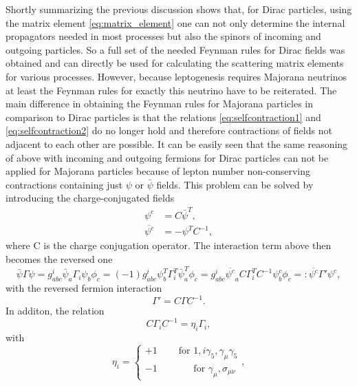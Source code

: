 Shortly summarizing the previous discussion shows that, for Dirac particles, using the matrix element \eqref{eq:matrix_element} one can not only determine the internal propagators needed in most processes but also the spinors of incoming and outgoing particles. So a full set of the needed Feynman rules for Dirac fields was obtained and can directly be used for calculating the scattering matrix elements for various processes. \newline\indent
However, because leptogenesis requires Majorana neutrinos at least the Feynman rules for exactly this neutrino have to be reiterated. The main difference in obtaining the Feynman rules for Majorana particles in comparison to Dirac particles is that the relations \eqref{eq:selfcontraction1} and \eqref{eq:selfcontraction2} do no longer hold and therefore contractions of fields not adjacent to each other are possible. It can be easily seen that the same reasoning of above with incoming and outgoing fermions for Dirac particles can not be applied for Majorana particles because of lepton number non-conserving contractions containing just $\psi$ or $\bar{\psi}$ fields.\newline\indent
This problem can be solved by introducing the charge-conjugated fields 
\begin{align*}
	\psi^c&=C\bar{\psi}^T,\\
	\overline{\psi^c}&=-\psi^T C^{-1},
\end{align*}
where C is the charge conjugation operator. The interaction term above then becomes the reversed one
\begin{equation*}
		\bar{\psi}\Gamma\psi=g^i_{abc}\bar{\psi}_a\Gamma_i\psi_b\phi_c=(-1)g^i_{abc}\psi_b^T\Gamma_i^T\bar{\psi}_a^T\phi_c=g^i_{abc}\overline{\psi^c}_aC\Gamma_i^TC^{-1}\psi^c_b\phi_c=:\overline{\psi^c}\Gamma'\psi^c,
\end{equation*}
with the reversed fermion interaction
\begin{equation*}
	\Gamma'=C\Gamma C^{-1}.
\end{equation*}
In additon, the relation
\begin{equation*}
	C\Gamma_i C^{-1}=\eta_i\Gamma_i,
\end{equation*}
with 
\begin{equation*}
	\eta_i=\left\{\begin{array}{c}+1\:\:\:\:\:\:\:\:\:\:\text{for } 1,i\gamma_5,\gamma_\mu\gamma_5\\-1\:\:\:\:\:\:\:\:\:\:\:\:\:\:\:\:\:\text{for }\gamma_\mu,\sigma_{\mu\nu}\end{array}\right.,
\end{equation*}
